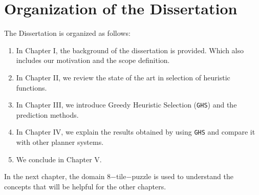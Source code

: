 \section{Organization of the Dissertation}
\noindent
The Dissertation is organized as follows: 
\begin{enumerate}
\item In Chapter I, the background of the dissertation is provided. Which also includes our motivation and the scope definition.
\item In Chapter II, we review the state of the art in selection of heuristic functions.
\item In Chapter III, we introduce Greedy Heuristic Selection (\texttt{GHS}) and the prediction methods. 
\item In Chapter IV, we explain the results obtained by using \texttt{GHS} and compare it with other planner systems.
\item We conclude in Chapter V.
\end{enumerate}

In the next chapter, the domain 8$-$tile$-$puzzle is used to understand the concepts that will be helpful for the other chapters. \\

\clearpage
